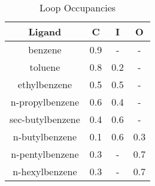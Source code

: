 \documentclass[T4paper.tex]{subfiles}
\begin{document}
\begin{table}[!htb]
\centering
\caption{Loop Occupancies \cite{Merski2015}}
\label{tbl:loop-occ}
\begin{tabular}{|c|c|c|c|}
\hline
\textbf{Ligand}                                                 & \textbf{C} & \textbf{I} & \textbf{O} \\ \hline
\cellcolor[HTML]{800080} benzene          & \cellcolor[HTML]{C0C0C0}0.9        & -          & -          \\ \hline
\cellcolor[HTML]{800080} toluene          & \cellcolor[HTML]{C0C0C0}0.8        & 0.2        & -          \\ \hline
\cellcolor[HTML]{800080} ethylbenzene     & \cellcolor[HTML]{C0C0C0}0.5        & 0.5        & -          \\ \hline
\cellcolor[HTML]{800080} n-propylbenzene  & \cellcolor[HTML]{C0C0C0}0.6        & 0.4        & -          \\ \hline
\cellcolor[HTML]{00FFFF} sec-butylbenzene & 0.4        & \cellcolor[HTML]{C0C0C0}0.6        & -          \\ \hline
\cellcolor[HTML]{00FFFF} n-butylbenzene   & 0.1        & \cellcolor[HTML]{C0C0C0}0.6        & 0.3        \\ \hline
\cellcolor[HTML]{008000} n-pentylbenzene  & 0.3        &    -        & \cellcolor[HTML]{C0C0C0}0.7        \\ \hline
\cellcolor[HTML]{008000} n-hexylbenzene   & 0.3        &    -       & \cellcolor[HTML]{C0C0C0}0.7        \\ \hline
\end{tabular}
\end{table}
\end{document}
